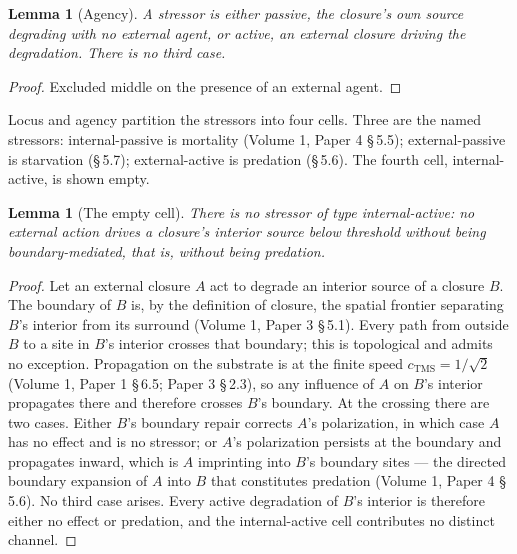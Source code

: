 \documentclass[11pt,oneside]{report}
\newtheorem{lemma}[theorem]{Lemma}
\theoremstyle{definition}
\theoremstyle{remark}
\begin{document}
\begin{lemma}[Agency]
A stressor is either passive, the closure's own source degrading with no external agent, or active, an external closure driving the degradation. There is no third case.
\end{lemma}

\begin{proof}
Excluded middle on the presence of an external agent.
\end{proof}

Locus and agency partition the stressors into four cells. Three are the named stressors: internal-passive is mortality (Volume 1, Paper 4 \S\,5.5); external-passive is starvation (\S\,5.7); external-active is predation (\S\,5.6). The fourth cell, internal-active, is shown empty.

\begin{lemma}[The empty cell]
There is no stressor of type internal-active: no external action drives a closure's interior source below threshold without being boundary-mediated, that is, without being predation.
\end{lemma}

\begin{proof}
Let an external closure \ensuremath{A} act to degrade an interior source of a closure \ensuremath{B}. The boundary of \ensuremath{B} is, by the definition of closure, the spatial frontier separating \ensuremath{B}'s interior from its surround (Volume 1, Paper 3 \S\,5.1). Every path from outside \ensuremath{B} to a site in \ensuremath{B}'s interior crosses that boundary; this is topological and admits no exception. Propagation on the substrate is at the finite speed \ensuremath{c_{\mathrm{TMS}} = 1/\sqrt{2}} (Volume 1, Paper 1 \S\,6.5; Paper 3 \S\,2.3), so any influence of \ensuremath{A} on \ensuremath{B}'s interior propagates there and therefore crosses \ensuremath{B}'s boundary. At the crossing there are two cases. Either \ensuremath{B}'s boundary repair corrects \ensuremath{A}'s polarization, in which case \ensuremath{A} has no effect and is no stressor; or \ensuremath{A}'s polarization persists at the boundary and propagates inward, which is \ensuremath{A} imprinting into \ensuremath{B}'s boundary sites --- the directed boundary expansion of \ensuremath{A} into \ensuremath{B} that constitutes predation (Volume 1, Paper 4 \S\,5.6). No third case arises. Every active degradation of \ensuremath{B}'s interior is therefore either no effect or predation, and the internal-active cell contributes no distinct channel.
\end{proof}
\end{document}
